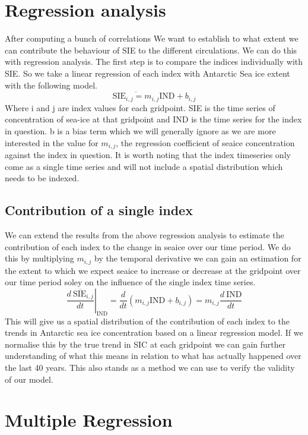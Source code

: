 \section{Regression analysis}
After computing a bunch of correlations We want to establish to what extent we can contribute the behaviour of SIE to the different circulations. We can do this with regression analysis. The first step is to compare the indices individually with SIE. So we take a linear regression of each index with Antarctic Sea ice extent with the following model.
$$
\overline{\text{SIE}_{i,j} = m_{i,j}}  \text{IND} + b_{i,j}
$$
Where i and j are index values for each gridpoint. SIE is the time series of concentration of sea-ice at that gridpoint and IND is the time series for the index in question. b is a bias term which we will generally ignore as we are more interested in the value for $m_{i,j}$, the regression coefficient of seaice concentration against the index in question. It is worth noting that the index timeseries only come as a single time series and will not include a spatial distribution which needs to be indexed.

\subsection{Contribution of a single index}
We can extend the results from the above regression analysis to estimate the contribution of each index to the change in seaice over our time period. We do this by multiplying $m_{i,j}$ by the temporal derivative we can gain an estimation for the extent to which we expect seaice to increase or decrease at the gridpoint over our time period soley on the influence of the single index time series.
$$
\left. \overline{\frac{d\  \text{SIE}_{i,j}}{dt}}\right|_{\text{IND}} = \frac{d}{dt} \left(m_{i,j}  \text{IND} + b_{i,j}\right) = m_{i,j}  \frac{d\ \text{IND}}{dt}
$$
This will give us a spatial distribution of the contribution of each index to the trends in Antarctic sea ice concentration based on a linear regression model. If we normalise this by the true trend in SIC at each gridpoint we can gain further understanding of what this means in relation to what has actually happened over the last 40 years. This also stands as a method we can use to verify the validity of our model.

\section{Multiple Regression}

